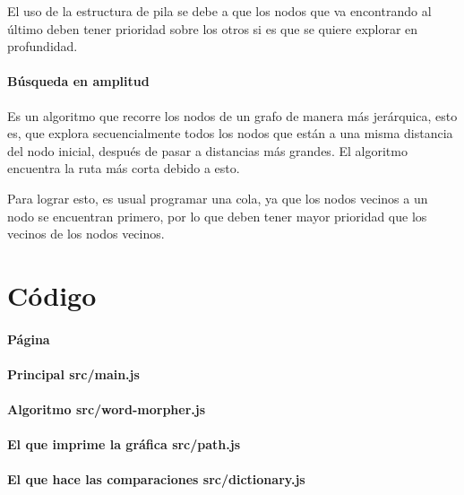 \documentclass[40pt,a4paper]{article}
\begin{document}
El uso de la estructura de pila se debe a que los nodos que va encontrando
al último deben tener prioridad sobre los otros si es que se quiere explorar
en profundidad.

\paragraph{Búsqueda en amplitud}
Es un algoritmo que recorre los nodos de un grafo de manera más jerárquica,
esto es, que explora secuencialmente todos los nodos que están a una misma
distancia del nodo inicial, después de pasar a distancias más grandes. El
algoritmo encuentra la ruta más corta debido a esto.

Para lograr esto, es usual programar una cola, ya que los nodos vecinos
a un nodo se encuentran primero, por lo que deben tener mayor prioridad
que los vecinos de los nodos vecinos.

\section{Código}

\paragraph{Página}


\paragraph{Principal src/main.js}


\paragraph{Algoritmo src/word-morpher.js}


\paragraph{El que imprime la gráfica src/path.js}


\paragraph{El que hace las comparaciones src/dictionary.js}

\end{document}
